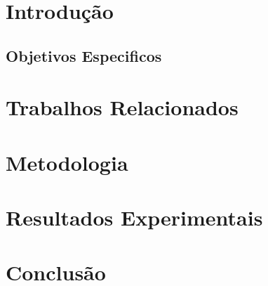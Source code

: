 \documentclass[
12pt,				%
openright,			%
oneside,
a4paper,			%
english,			%
french,				%
spanish,			%
brazil,				%
]{abntex2}
\begin{document}
        \chapter[Introdução]{Introdução}

        
        

	\section{Objetivos Especificos}
	
	
	

	\chapter{Trabalhos Relacionados}
	
	


	
	\chapter{Metodologia}
        



    \chapter{Resultados Experimentais}
        
    
		
	\chapter{Conclusão}
        
	
	
	
\end{document}
